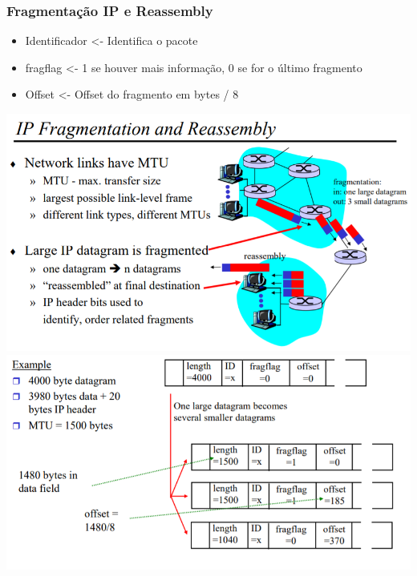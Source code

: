 \documentclass{article}
\begin{document}
\subsubsection{Fragmentação IP e Reassembly}
\begin{itemize}
    \item Identificador <- Identifica o pacote
    \item fragflag <- 1 se houver mais informação, 0 se for o último fragmento
	\item Offset <- Offset do fragmento em bytes / 8
\end{itemize}
\begin{center}
    \includegraphics[width=14cm]{images/RCOM14.png}
    \includegraphics[width=14cm]{images/RCOM15.png}
\end{center}
\end{document}
